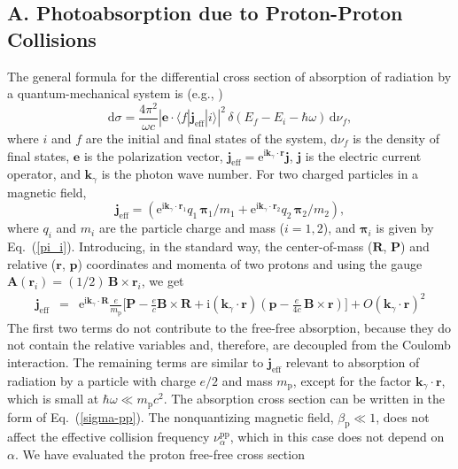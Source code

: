 \documentclass{emulateapj}
\newcommand{\beq}{\begin{equation}}
\newcommand{\eeq}{\end{equation}}
\newcommand{\bea}{\begin{eqnarray}}
\newcommand{\eea}{\end{eqnarray}}
\newcommand{\req}[1]{Eq.\ (\ref{#1})}
\newcommand{\mpr}{m_\mathrm{p}}
\newcommand{\dd}{\mathrm{d}}
\begin{document}
\begin{appendix}

\section{A. Photoabsorption due to Proton-Proton Collisions}
\label{sect-pp}
%
The general formula for the differential cross section
of absorption of radiation by a quantum-mechanical system
 is (e.g., \citealp{Armstrong})
\beq
   \dd\sigma=\frac{4\pi^2}{\omega c}
   \left|\bm{e}\cdot\langle f| \bm{j}_\mathrm{eff} | i \rangle
   \right|^2\,\delta(E_f-E_i-\hbar\omega)\,\dd\nu_f,
\label{dsigma}
\eeq
where $i$ and $f$ are the initial and final states of 
the system, $\dd\nu_f$ is the density of final states,
$\bm{e}$ is the polarization vector, 
$\bm{j}_\mathrm{eff}=
\mathrm{e}^{\mathrm{i}\bm{k}_\gamma\cdot\bm{r}} \bm{j}$,
$\bm{j}$ is the electric current operator, and $\bm{k}_\gamma$
is the photon wave number.
For two charged particles in a magnetic field,
\beq
   \bm{j}_\mathrm{eff}=
   (\mathrm{e}^{\mathrm{i}\bm{k}_\gamma\cdot\bm{r}_1}
   q_1\,\bm{\pi}_1/m_1 + 
   \mathrm{e}^{\mathrm{i}\bm{k}_\gamma\cdot\bm{r}_2}
   q_2\,\bm{\pi}_2/m_2),
\eeq
where $q_i$ and $m_i$ are the particle charge and mass ($i=1,2$),
and $\bm{\pi}_i$ is given by \req{pi_i}.
Introducing, in the standard way, the center-of-mass 
($\bm{R}$, $\bm{P}$)
and relative ($\bm{r}$, $\bm{p}$) coordinates and momenta
of two protons and using the gauge 
$\bm{A}(\bm{r}_i)=(1/2)\,\bm{B}\times\bm{r}_i$, we get
\bea
   \bm{j}_\mathrm{eff} &=& 
   \mathrm{e}^{\mathrm{i}\bm{k}_\gamma\cdot\bm{R}} \frac{e}{\mpr}\bigg[
  \bm{P} - \frac{e}{c} \bm{B}\times\bm{R} 
    + \mathrm{i}(\bm{k}_\gamma\cdot\bm{r})
    \left( \bm{p} - \frac{e}{4 c}\,\bm{B}\times\bm{r}\right)
    \bigg] + O(\bm{k}_\gamma\cdot\bm{r})^2
\eea
The first two terms do not contribute to the free-free absorption,
because they do not contain the relative variables and, therefore,
are decoupled from the Coulomb interaction.
The remaining terms are similar to $\bm{j}_\mathrm{eff}$
relevant to absorption of radiation by a particle with charge
$e/2$ and mass $\mpr$, except for the factor 
$\bm{k}_\gamma\cdot\bm{r}$, which is small
at $\hbar\omega\ll\mpr c^2$. 
The absorption cross section can be written in the form of \req{sigma-pp}.
The nonquantizing magnetic field,
$\beta_\mathrm{p} \ll1$,
does not affect the effective collision frequency
 $\nu_{\alpha}^\mathrm{pp}$, which in this case
does not depend on $\alpha$. 
We have evaluated the proton free-free cross section

\end{appendix}
\end{document}
